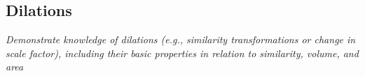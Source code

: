 \subsection[dilations]{Dilations}


\textit{Demonstrate knowledge of dilations (e.g., similarity transformations or change in scale factor), including their basic properties in relation to similarity, volume, and area}